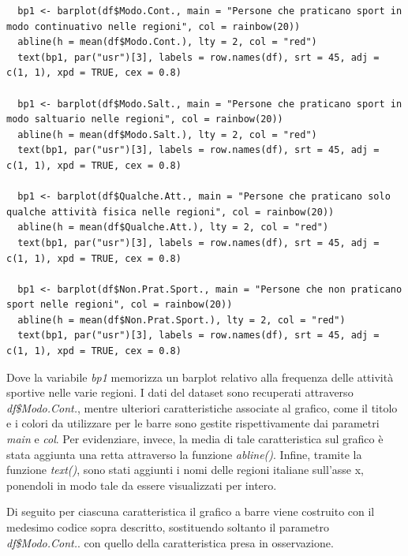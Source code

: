 \vspace{5mm}
\begin{lstlisting}
  bp1 <- barplot(df$Modo.Cont., main = "Persone che praticano sport in modo continuativo nelle regioni", col = rainbow(20))
  abline(h = mean(df$Modo.Cont.), lty = 2, col = "red")
  text(bp1, par("usr")[3], labels = row.names(df), srt = 45, adj = c(1, 1), xpd = TRUE, cex = 0.8)

  bp1 <- barplot(df$Modo.Salt., main = "Persone che praticano sport in modo saltuario nelle regioni", col = rainbow(20))
  abline(h = mean(df$Modo.Salt.), lty = 2, col = "red")
  text(bp1, par("usr")[3], labels = row.names(df), srt = 45, adj = c(1, 1), xpd = TRUE, cex = 0.8)

  bp1 <- barplot(df$Qualche.Att., main = "Persone che praticano solo qualche attività fisica nelle regioni", col = rainbow(20))
  abline(h = mean(df$Qualche.Att.), lty = 2, col = "red")
  text(bp1, par("usr")[3], labels = row.names(df), srt = 45, adj = c(1, 1), xpd = TRUE, cex = 0.8)

  bp1 <- barplot(df$Non.Prat.Sport., main = "Persone che non praticano sport nelle regioni", col = rainbow(20))
  abline(h = mean(df$Non.Prat.Sport.), lty = 2, col = "red")
  text(bp1, par("usr")[3], labels = row.names(df), srt = 45, adj = c(1, 1), xpd = TRUE, cex = 0.8)

\end{lstlisting}
\vspace{5mm}

Dove la variabile \textit{bp1} memorizza un barplot relativo alla frequenza delle attività sportive nelle varie regioni. I dati del dataset sono recuperati attraverso \textit{df\$Modo.Cont.}, mentre ulteriori caratteristiche associate al grafico, come il titolo e i colori da utilizzare per le barre sono gestite rispettivamente dai parametri \textit{main} e \textit{col}. Per evidenziare, invece, la media di tale caratteristica sul grafico è stata aggiunta una retta attraverso la funzione \textit{abline()}. Infine, tramite la funzione \textit{text()}, sono stati aggiunti i nomi delle regioni italiane sull’asse x, ponendoli in modo tale da essere visualizzati per intero.

Di seguito per ciascuna caratteristica il grafico a barre viene costruito con il medesimo codice sopra descritto, sostituendo soltanto il parametro \textit{df\$Modo.Cont.}. con quello della caratteristica presa in osservazione.

